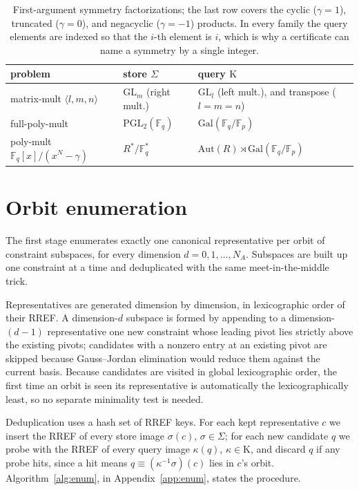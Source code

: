 \documentclass[11pt]{article}
\theoremstyle{definition}
\newcommand{\F}{\mathbb{F}}
\newcommand{\GL}{\mathrm{GL}}
\newcommand{\PGL}{\mathrm{PGL}}
\newcommand{\Gal}{\mathrm{Gal}}
\newcommand{\Aut}{\mathrm{Aut}}
\newcommand{\Kappa}{\mathrm{K}}
\newcommand{\mmt}[3]{\langle #1,#2,#3\rangle}
\begin{document}
\begin{table}[h]
  \centering
  \setlength{\tabcolsep}{10pt}
  \begin{tabular}{lll}
    \toprule
    problem                            & store $\Sigma$        & query $\Kappa$                                \\
    \midrule
    matrix-mult $\mmt{l}{m}{n}$        & $\GL_m$ (right mult.) & $\GL_l$ (left mult.), and transpose ($l=m=n$) \\
    full-poly-mult                     & $\PGL_2(\F_q)$        & $\Gal(\F_q/\F_p)$                             \\
    poly-mult $\F_q[x]/(x^N{-}\gamma)$ & $R^*/\F_q^*$          & $\Aut(R)\rtimes\Gal(\F_q/\F_p)$               \\
    \bottomrule
  \end{tabular}
  \caption{First-argument symmetry factorizations; the last row covers the cyclic
    ($\gamma=1$), truncated ($\gamma=0$), and negacyclic ($\gamma=-1$) products. In every family the
    query elements are indexed so that the $i$-th element is $i$, which is why a
  certificate can name a symmetry by a single integer.}
  \label{tab:symmetry}
\end{table}

\section{Orbit enumeration}\label{sec:orbits}

The first stage enumerates exactly one canonical representative per orbit of
constraint subspaces, for every dimension $d=0,1,\dots,N_A$. Subspaces are built
up one constraint at a time and deduplicated with the same meet-in-the-middle trick.

Representatives are generated dimension by dimension, in lexicographic
order of their RREF. A dimension-$d$ subspace is formed by
appending to a dimension-$(d-1)$ representative one new constraint whose leading
pivot lies strictly above the existing pivots; candidates with a nonzero
entry at an existing pivot are skipped because Gauss--Jordan elimination would
reduce them against the current basis. Because candidates are visited in global
lexicographic order, the first time an orbit is seen its representative is
automatically the lexicographically least, so no separate minimality test is
needed.

Deduplication uses a hash set of RREF keys.
For each kept representative $c$ we insert the RREF of every store image
$\sigma(c)$, $\sigma\in\Sigma$; for each new candidate $q$ we probe with
the RREF of every query image $\kappa(q)$, $\kappa\in\Kappa$, and
discard $q$ if any probe hits, since a hit means $q\equiv (\kappa^{-1}\sigma)(c)$
lies in $c$'s orbit. Algorithm~\ref{alg:enum}, in Appendix~\ref{app:enum}, states the procedure.
\end{document}
